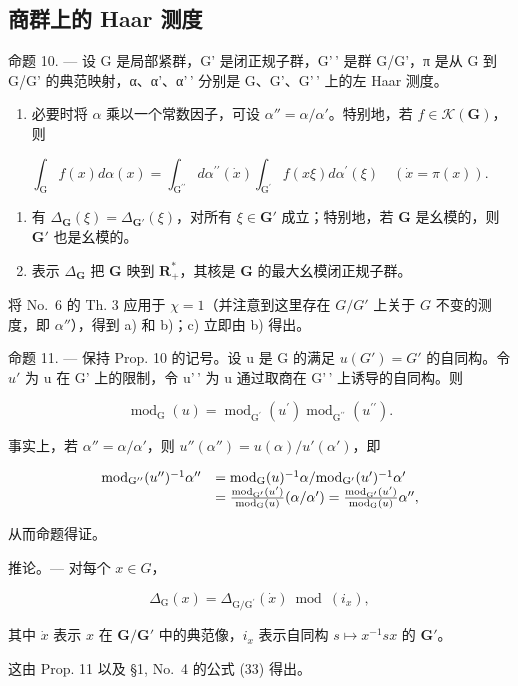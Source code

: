 \subsection{商群上的 Haar 测度}

命题 10. --- 设 G 是局部紧群，G' 是闭正规子群，G'\,' 是群 G/G'，π 是从 G 到 G/G' 的典范映射，α、α'、α'\,' 分别是 G、G'、G'\,' 上的左 Haar 测度。

\begin{enumerate}
\def\labelenumi{\alph{enumi})}
\tightlist
\item
  必要时将 \(\alpha\) 乘以一个常数因子，可设 \(\alpha'' = \alpha / \alpha'\)。特别地，若 \(f \in \mathcal{K}(\mathbf{G})\)，则
\end{enumerate}

\[
\int_ {\mathrm{G}} f (x) d \alpha (x) = \int_ {\mathrm{G} ^ {\prime \prime}} d \alpha^ {\prime \prime} (\dot {x}) \int_ {\mathrm{G} ^ {\prime}} f (x \xi) d \alpha^ {\prime} (\xi) \quad (\dot {x} = \pi (x)).
\]

\begin{enumerate}
\def\labelenumi{\alph{enumi})}
\setcounter{enumi}{1}
\item
  有 \(\Delta_{\mathbf{G}}(\xi) = \Delta_{\mathbf{G}'}(\xi)\)，对所有 \(\xi \in \mathbf{G}'\) 成立；特别地，若 \(\mathbf{G}\) 是幺模的，则 \(\mathbf{G}'\) 也是幺模的。
\item
  表示 \(\Delta_{\mathbf{G}}\) 把 \(\mathbf{G}\) 映到 \(\mathbf{R}_{+}^{*}\)，其核是 \(\mathbf{G}\) 的最大幺模闭正规子群。
\end{enumerate}

 将 No.~6 的 Th. 3 应用于 \(\chi = 1\)（并注意到这里存在 \(G / G'\) 上关于 \(G\) 不变的测度，即 \(\alpha''\)），得到 a) 和 b)；c) 立即由 b) 得出。

命题 11. --- 保持 Prop. 10 的记号。设 u 是 G 的满足 \(u(G') = G'\) 的自同构。令 \(u'\) 为 u 在 G' 上的限制，令 u'\,' 为 u 通过取商在 G'\,' 上诱导的自同构。则

\[
\operatorname{mod} _ {\mathrm{G}} (u) = \operatorname{mod} _ {\mathrm{G} ^ {\prime}} \left(u ^ {\prime}\right) \operatorname{mod} _ {\mathrm{G} ^ {\prime \prime}} \left(u ^ {\prime \prime}\right).
\]

事实上，若 \(\alpha'' = \alpha / \alpha'\)，则 \(u''(\alpha'') = u(\alpha) / u'(\alpha')\)，即

\[
\begin{array}{r l} \mathrm{mod} _ {\mathrm{G} ^ {\prime \prime}} (u ^ {\prime \prime}) ^ {- 1} \alpha^ {\prime \prime} & = \mathrm{mod} _ {\mathrm{G}} (u) ^ {- 1} \alpha / \mathrm{mod} _ {\mathrm{G} ^ {\prime}} (u ^ {\prime}) ^ {- 1} \alpha^ {\prime} \\ & = \frac {\mathrm{mod} _ {\mathrm{G} ^ {\prime}} (u ^ {\prime})}{\mathrm{mod} _ {\mathrm{G}} (u)} (\alpha / \alpha^ {\prime}) = \frac {\mathrm{mod} _ {\mathrm{G} ^ {\prime}} (u ^ {\prime})}{\mathrm{mod} _ {\mathrm{G}} (u)} \alpha^ {\prime \prime}, \end{array}
\]

从而命题得证。

推论。--- 对每个 \(x \in G\)，

\[
\Delta_ {\mathrm{G}} (x) = \Delta_ {\mathrm{G} / \mathrm{G} ^ {\prime}} (\dot {x}) \bmod (i _ {x}),
\]

其中 \(\dot{x}\) 表示 \(x\) 在 \(\mathbf{G} / \mathbf{G}'\) 中的典范像，\(i_x\) 表示自同构 \(s \mapsto x^{-1}sx\) 的 \(\mathbf{G}'\)。

这由 Prop. 11 以及 §1, No.~4 的公式 (33) 得出。

